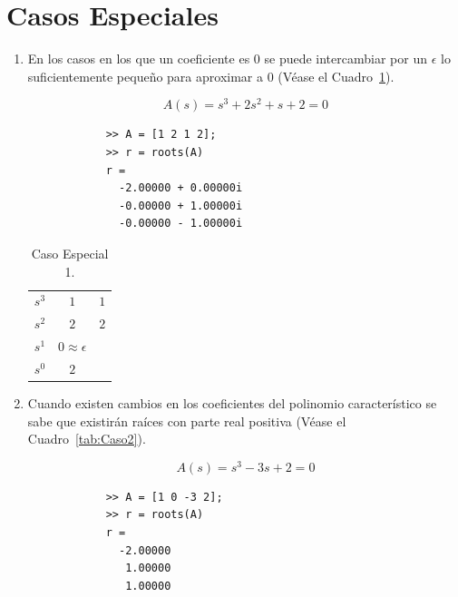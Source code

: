     \section{Casos Especiales}
        \begin{enumerate}

            \item En los casos en los que un coeficiente es $0$ se puede intercambiar por un $\epsilon$ lo suficientemente pequeño para aproximar a $0$ (Véase el Cuadro~\ref{tab:Caso1}).

            \begin{equation*}
            A(s) = s^3 + 2 s^2 + s + 2 = 0
            \end{equation*}

            \begin{verbatim}
            >> A = [1 2 1 2];
            >> r = roots(A)
            r =
              -2.00000 + 0.00000i
              -0.00000 + 1.00000i
              -0.00000 - 1.00000i
            \end{verbatim}

            \begin{table}[htbp]
                \centering
                \begin{tabular}{c|c c}
                $s^3$ & $1$ & $1$ \\
                $s^2$ & $2$ & $2$ \\
                $s^1$ & $0 \approx \epsilon$ \\
                $s^0$ & $2$
                \end{tabular}
            \caption{\label{tab:Caso1}Caso Especial 1.}
            \end{table}

            \item Cuando existen cambios en los coeficientes del polinomio característico se sabe que existirán raíces con parte real positiva (Véase el Cuadro~\ref{tab:Caso2}).

            \begin{equation*}
                A(s) = s^3 - 3 s + 2 = 0
            \end{equation*}

            \begin{verbatim}
            >> A = [1 0 -3 2];
            >> r = roots(A)
            r =
              -2.00000
               1.00000
               1.00000
            \end{verbatim}


\end{enumerate}
